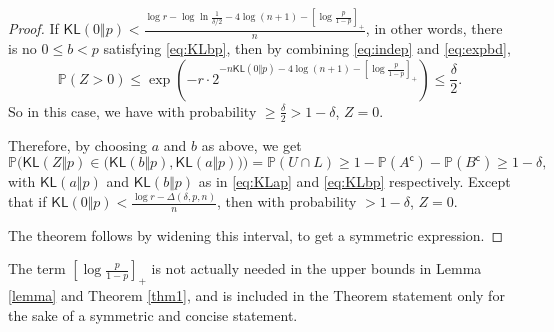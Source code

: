 \documentclass[12pt]{article}
\newcommand{\KL}{\textsf{KL}}
\newcommand{\comp}{\mathsf{c}}
\begin{document}
\begin{proof}
    If $\KL(0\Vert p) < \frac{\log r - \log \ln \frac{1}{\delta/2} - 4\log (n+1) - \left[ \log \frac{p}{1-p} \right]_+}{n}$, in other words, there is no $0\leq b < p$ satisfying \eqref{eq:KLbp}, then by combining \eqref{eq:indep} and \eqref{eq:expbd},
    \[
        \mathbb{P}(Z > 0)\leq \exp \left(-r \cdot 2^{-n\KL(0\Vert p) - 4\log (n+1) - \left[ \log \frac{p}{1-p} \right]_+}\right)
        \leq \frac{\delta}{2}.
    \]
    So in this case, we have with probability $\geq \frac{\delta}{2} > 1 - \delta$, $Z = 0$.

    Therefore, by choosing $a$ and $b$ as above, we get
    \begin{equation*}
        \mathbb{P}\Big(\KL(Z\Vert p) \in \big(\KL(b\Vert p), \KL(a\Vert p)\big)\Big) = \mathbb{P}(U\cap L) \geq 1 - \mathbb{P}(A^\comp) - \mathbb{P}(B^\comp) \geq 1-\delta,    
    \end{equation*}
    with $\KL(a\Vert p)$ and $\KL(b\Vert p)$ as in \eqref{eq:KLap} and \eqref{eq:KLbp} respectively. Except that if $\KL(0\Vert p) < \frac{\log r - \Delta(\delta, p, n)}{n}$, then with probability $> 1 - \delta$, $Z = 0$.
 
    The theorem follows by widening this interval, to get a symmetric expression.
\end{proof}

\begin{remark}
    The term $\left[\log \frac{p}{1-p}\right]_+$ is not actually needed in the upper bounds in Lemma \ref{lemma} and  Theorem \ref{thm1}, and is included in the Theorem statement only for the sake of a symmetric and concise statement.
\end{remark}
\end{document}
